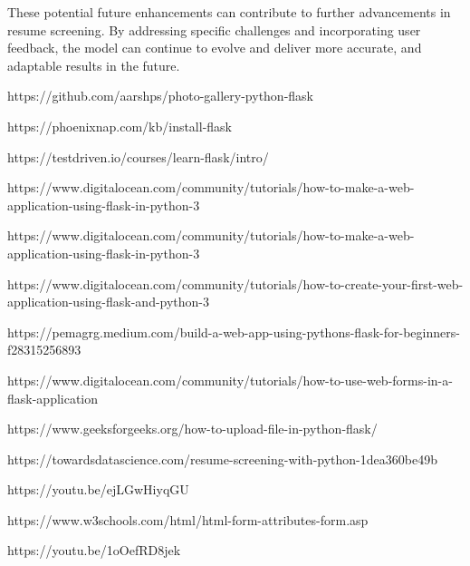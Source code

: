 \documentclass[12 pt, oneside]{book}
\begin{document}
\par These potential future enhancements can contribute to further advancements in resume screening. By addressing specific challenges and incorporating user feedback, the model can continue to evolve and deliver more accurate, and adaptable results in the future.

























%
%
%
%
%
\clearpage
{}
%
%
\begin{thebibliography}{99}
%
https://github.com/aarshps/photo-gallery-python-flask 

https://phoenixnap.com/kb/install-flask
  
https://testdriven.io/courses/learn-flask/intro/

https://www.digitalocean.com/community/tutorials/how-to-make-a-web-application-using-flask-in-python-3

 https://www.digitalocean.com/community/tutorials/how-to-make-a-web-application-using-flask-in-python-3

https://www.digitalocean.com/community/tutorials/how-to-create-your-first-web-application-using-flask-and-python-3

https://pemagrg.medium.com/build-a-web-app-using-pythons-flask-for-beginners-f28315256893

https://www.digitalocean.com/community/tutorials/how-to-use-web-forms-in-a-flask-application

 https://www.geeksforgeeks.org/how-to-upload-file-in-python-flask/

https://towardsdatascience.com/resume-screening-with-python-1dea360be49b

https://youtu.be/ejLGwHiyqGU

https://www.w3schools.com/html/html-form-attributes-form.asp

https://youtu.be/1oOefRD8jek




%
\end{thebibliography}
\end{document}
